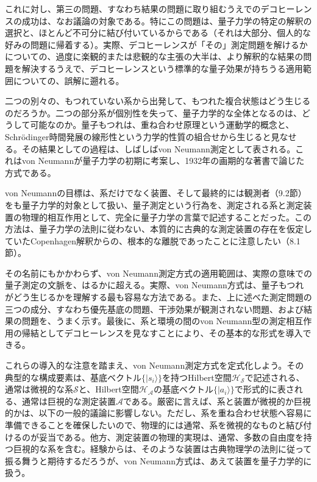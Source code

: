 これに対し、第三の問題、すなわち結果の問題に取り組むうえでのデコヒーレンスの成功は、なお議論の対象である。特にこの問題は、量子力学の特定の解釈の選択と、ほとんど不可分に結び付いているからである（それは大部分、個人的な好みの問題に帰着する）。実際、デコヒーレンスが「その」測定問題を解けるかについての、過度に楽観的または悲観的な主張の大半は、より解釈的な結果の問題を解決するうえで、デコヒーレンスという標準的な量子効果が持ちうる適用範囲についての、誤解に遡れる。

二つの別々の、もつれていない系から出発して、もつれた複合状態はどう生じるのだろうか。二つの部分系が個別性を失って、量子力学的な全体となるのは、どうして可能なのか。量子もつれは、重ね合わせ原理という運動学的概念と、Schrödinger時間発展の線形性という力学的性質の組合せから生じると見なせる。その結果としての過程は、しばしばvon Neumann測定として表される。これはvon Neumannが量子力学の初期に考案し、1932年の画期的な著書\cite{ref060}で論じた方式である。

von Neumannの目標は、系だけでなく装置、そして最終的には観測者（9.2節）をも量子力学的対象として扱い、量子測定という行為を、測定される系と測定装置の物理的相互作用として、完全に量子力学の言葉で記述することだった。この方法は、量子力学の法則に従わない、本質的に古典的な測定装置の存在を仮定していたCopenhagen解釈からの、根本的な離脱であったことに注意したい（8.1節）。

\hypertarget{srcpage:51}{}\label{srcpage:51}
その名前にもかかわらず、von Neumann測定方式の適用範囲は、実際の意味での量子測定の文脈を、はるかに超える。実際、von Neumann方式は、量子もつれがどう生じるかを理解する最も容易な方法である。また、上に述べた測定問題の三つの成分、すなわち優先基底の問題、干渉効果が観測されない問題、および結果の問題を、うまく示す。最後に、系と環境の間のvon Neumann型の測定相互作用の帰結としてデコヒーレンスを見なすことにより、その基本的な形式を導入できる。

これらの導入的な注意を踏まえ、von Neumann測定方式を定式化しよう。その典型的な構成要素は、基底ベクトル$\{\lvert s_i\rangle\}$を持つHilbert空間$\mathcal H_{\mathcal S}$で記述される、通常は微視的な系$\mathcal S$と、Hilbert空間$\mathcal H_{\mathcal A}$の基底ベクトル$\{\lvert a_i\rangle\}$で形式的に表される、通常は巨視的な測定装置$\mathcal A$である。厳密に言えば、系と装置が微視的か巨視的かは、以下の一般的議論に影響しない。ただし、系を重ね合わせ状態へ容易に準備できることを確保したいので、物理的には通常、系を微視的なものと結び付けるのが妥当である。他方、測定装置の物理的実現は、通常、多数の自由度を持つ巨視的な系を含む。経験からは、そのような装置は古典物理学の法則に従って振る舞うと期待するだろうが、von Neumann方式は、あえて装置を量子力学的に扱う。

